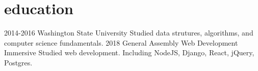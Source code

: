 \documentclass[]{friggeri-cv}
\begin{document}
\section{education}

\begin{entrylist}
  \entry
    {2014-2016}
    {Washington State University}
    {}
    {Studied data strutures, algorithms, and computer science fundamentals.}
  \entry
    {2018}
    {General Assembly}
    {Web Development Immersive}
    {Studied web development. Including NodeJS, Django, React, jQuery, Postgres.}

\end{entrylist}
\end{document}
